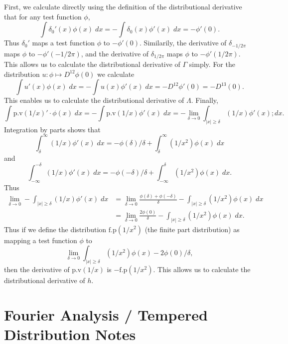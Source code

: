 \documentclass[answers]{exam}
\theoremstyle{problemstyle}
\newcommand{\1}[1]{\textbf{1}_{\left[#1\right]}} %
\begin{document}
\begin{questions}
\begin{solution}
    First, we calculate directly using the definition of the distributional derivative that for any test function $\phi$,
    \[ \int \delta_0'(x) \phi(x)\; dx = - \int \delta_0(x) \phi'(x)\; dx = - \phi'(0). \]
    Thus $\delta_0'$ maps a test function $\phi$ to $-\phi'(0)$. Similarily, the derivative of $\delta_{-1/2\pi}$ maps $\phi$ to $-\phi'(-1/2\pi)$, and the derivative of $\delta_{1/2\pi}$ maps $\phi$ to $-\phi'(1/2\pi)$. This allows us to calculate the distributional derivative of $\Gamma$ simply. For the distribution $u: \phi \mapsto D^{12} \phi(0)$ we calculate
    \[ \int u'(x) \phi(x)\; dx = -\int u(x) \phi'(x)\; dx = - D^{12} \phi'(0) = - D^{13}(0). \]
    This enables us to calculate the distributional derivative of $\Lambda$. Finally,
    \[ \int \text{p.v}(1/x)' \cdot \phi(x)\; dx = -\int \text{p.v}(1/x) \phi'(x)\; dx = - \lim_{\delta \to 0} \int_{|x| \geq \delta} (1/x) \phi'(x); dx. \]
    Integration by parts shows that
    \[ \int_\delta^\infty (1/x) \phi'(x)\; dx = - \phi(\delta) / \delta + \int_\delta^\infty (1/x^2) \phi(x)\; dx \]
    and
    \[ \int_{-\infty}^{-\delta} (1/x) \phi'(x)\; dx = -\phi(-\delta)/\delta + \int_{-\infty}^\delta (1/x^2) \phi(x)\; dx. \]
    Thus
    \begin{align*}
        \lim_{\delta \to 0} - \int_{|x| \geq \delta} (1/x) \phi'(x)\; dx &= \lim_{\delta \to 0} \frac{\phi(\delta) + \phi(-\delta)}{\delta} - \int_{|x| \geq \delta} (1/x^2) \phi(x)\; dx\\
        &= \lim_{\delta \to 0} \frac{2 \phi(0)}{\delta} - \int_{|x| \geq \delta} (1/x^2) \phi(x)\; dx.
    \end{align*}
    Thus if we define the distribution $\text{f.p}(1/x^2)$ (the finite part distribution) as mapping a test function $\phi$ to
    \[ \lim_{\delta \to 0} \int_{|x| \geq \delta} (1/x^2) \phi(x) - 2 \phi(0) / \delta, \]
    then the derivative of $\text{p.v}(1/x)$ is $- \text{f.p}(1/x^2)$. This allows us to calculate the distributional derivative of $h$.
\end{solution}










\newpage
\section{Fourier Analysis / Tempered Distribution Notes}


\end{questions}
\end{document}
